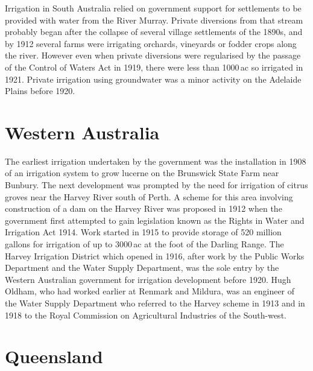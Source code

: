 Irrigation in South Australia relied on government support for
settlements to be provided with water from the River Murray.  Private
diversions from that stream probably began after the collapse of
several village settlements of the 1890s, and by 1912 several farms
were irrigating orchards, vineyards or fodder crops along the
river.  However
even when private diversions were regularised by the passage of the
Control of Waters Act in 1919, there were less than 1000\,ac so
irrigated in 1921. Private irrigation using groundwater was a
minor activity on the Adelaide Plains before 1920.

\section*{Western Australia}

The earliest irrigation undertaken by the government was the
installation in 1908 of an irrigation system to grow lucerne on the
Brunswick State Farm near Bunbury. The next development was prompted
by the need for irrigation of citrus groves near the Harvey River
south of Perth. A scheme for this area involving construction of a dam
on the Harvey River was proposed in 1912 when the government first
attempted to gain legislation known as the Rights in Water and
Irrigation Act 1914.  Work started in 1915 to provide storage of 520 million
gallons for irrigation of up to 3000\,ac at the foot of the Darling
Range.  The Harvey Irrigation District which opened in 1916, after
work by the Public Works Department and the Water Supply Department,
was the sole entry by the Western Australian government for irrigation
development before 1920.  Hugh Oldham, who had worked earlier at
Renmark and Mildura, was an engineer of the Water Supply Department
who referred to the Harvey scheme in 1913 and in 1918 to the Royal
Commission on Agricultural Industries of the
South-west.

\section*{Queensland}


